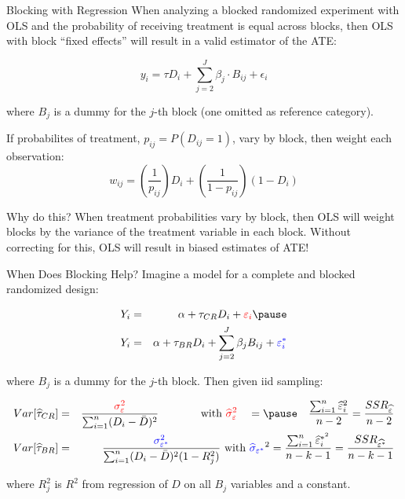 \documentclass{beamer}
\numberwithin{equation}{section}
\begin{document}
\begin{frame}{Blocking with Regression}
\small
When analyzing a blocked randomized experiment with OLS and the
probability of receiving treatment is equal across blocks, then OLS with
block ``fixed effects'' will result in a valid estimator of the ATE:

\[ y_i =   \tau D_i + \sum_{j=2}^{J} \beta_j \cdot B_{ij} + \epsilon_i\]

where $B_j$ is a dummy for the $j$-th block (one omitted as reference category).\bigskip \pause

If probabilites of treatment, $p_{ij}=P(D_{ij}=1)$, vary by block, then weight each
observation:
\[ w_{ij} = \left ( \frac{1}{p_{ij}} \right ) D_i + \left ( \frac{1}{1 - p_{ij}} \right ) (1 - D_i)\]

\pause 

Why do this? When treatment probabilities vary by
block, then OLS will weight blocks by the variance of the treatment
variable in each block. Without correcting for this, OLS will result in
biased estimates of ATE!

\end{frame}



\begin{frame}{When Does Blocking Help?}
\small
Imagine a model for a complete and blocked randomized design:

\begin{small}
\begin{eqnarray}
  Y_i &=& \alpha + \tau_{CR} D_i + \textcolor{red}{\varepsilon_i} \pause \\
  Y_i &=& \alpha + \tau_{BR} D_i + \sum_{j=2}^J \beta_j B_{ij}+ \textcolor{blue}{\varepsilon^{\ast}_i}
\end{eqnarray}
\end{small}

where $B_j$ is a dummy for the $j$-th block. Then given iid sampling:
\pause

\begin{small}
\begin{eqnarray}
Var[\widehat{\tau}_{CR}]  &=& \frac{\textcolor{red}{\sigma_{\varepsilon}^2}}{\sum_{i=1}^n (D_i - \bar{D})^2}\quad \,\,\, \quad \quad \mbox{ with } \textcolor{red}{\widehat{\sigma}_{\varepsilon}^2} \quad = \pause \quad\frac{\sum_{i=1}^n \widehat{\varepsilon}_i^2}{n-2}=\frac{SSR_{\widehat{\varepsilon}}}{n-2}\nonumber \\
Var[\widehat{\tau}_{BR}]  &=&  \frac{\textcolor{blue}{\sigma_{\varepsilon^{\ast}}^2}}{\sum_{i=1}^n (D_{i} - \bar{D})^2 (1-R_j^2)}\mbox{ with } \textcolor{blue}{\widehat{\sigma}_{\varepsilon^{\ast}}}^2 = \frac{\sum_{i=1}^n \widehat{ \varepsilon }^{\ast^2}_{i}}{n-k-1}=\frac{SSR_{\widehat{\varepsilon^{\ast}}}}{n-k-1}\nonumber
\end{eqnarray}
\end{small}

where $R_j^2$ \pause is $R^2$ from regression of $D$ on all $B_j$
variables and a constant.

\end{frame}
\end{document}
